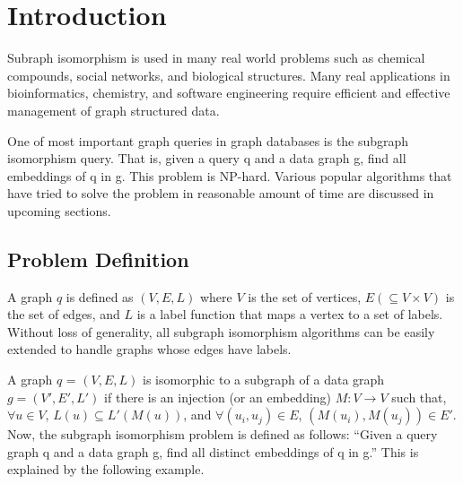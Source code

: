 \documentclass[
10pt, %
a4paper, %
oneside, %
headinclude,footinclude, %
BCOR5mm, %
]{scrartcl}
\begin{document}

\let\thefootnote\relax{}



\newpage %


\section{Introduction}

Subraph isomorphism is used in many real world problems such as chemical compounds, social networks, and biological structures. Many real applications in bioinformatics, chemistry, and software engineering require efficient and effective management of graph structured data.

One of most important graph queries in graph databases is the subgraph isomorphism query. That is, given a query q and a data graph g, find all embeddings of q in g. This problem is NP-hard. Various popular algorithms that have tried to solve the problem in reasonable amount of time are discussed in upcoming sections.

\subsection{Problem Definition}
A graph $q$ is defined as $(V, E,L)$ where $V$ is the set of vertices, $E(\subseteq V \times V)$ is the set of edges, and $L$ is a label function that maps a vertex to a set of labels. Without loss of generality, all subgraph isomorphism algorithms can be easily extended to handle graphs whose edges have labels.

A graph $q$ = $(V, E,L)$ is isomorphic to a subgraph of a data graph $g = (V', E', L')$ if there is an injection (or an embedding) $M : V \rightarrow V$ such that, $\forall u \in V $, $L(u) \subseteq L' (M(u))$, and $\forall (u_i, u_j) \in E$, $(M(u_i), M(u_j)) \in E'$.\\
Now, the subgraph isomorphism problem is defined as follows: “Given a query graph q and a data graph g, find all distinct embeddings of q in g.” This is explained by the following example.
\end{document}
